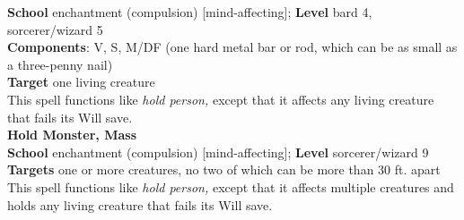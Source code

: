 \textbf{School} enchantment (compulsion) [mind-affecting]; \textbf{Level} bard 4, sorcerer/wizard 5\\
\textbf{Components}: V, S, M/DF (one hard metal bar or rod, which can be as small as a three-penny nail)\\
\textbf{Target} one living creature\\
This spell functions like \textit{hold person, }except that it affects any living creature that fails its Will save.\\
\textbf{Hold Monster, Mass}\\
\textbf{School} enchantment (compulsion) [mind-affecting]; \textbf{Level} sorcerer/wizard 9\\
\textbf{Targets} one or more creatures, no two of which can be more than 30 ft. apart\\
This spell functions like \textit{hold person, }except that it affects multiple creatures and holds any living creature that fails its Will save.\\
